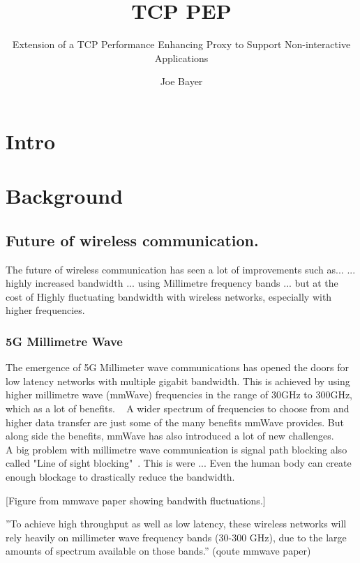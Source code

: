 \documentclass[a4paper,english, 11pt]{report}
\author{Joe Bayer}
\title{TCP PEP}
\subtitle{Extension of a TCP Performance Enhancing Proxy to
Support Non-interactive Applications}
\begin{document}
\uiomasterfp[program={Informatics: Programming and System Architecture}, supervisors={Michael Welzl\and Kristjon Ciko}]

\tableofcontents

\chapter{Intro}

\chapter{Background}

\section{Future of wireless communication.}
The future of wireless communication has seen a lot of improvements such as...
... highly increased bandwidth ... using Millimetre frequency bands ... but at the cost of Highly fluctuating bandwidth with wireless networks, especially with higher frequencies.\\ 

\subsection{5G Millimetre Wave}
The emergence of 5G Millimeter wave communications has opened the doors for low latency networks with multiple gigabit bandwidth. This is achieved by using higher millimetre wave (mmWave) frequencies in the range of 30GHz to 300GHz, which as a lot of benefits. ~\cite{Agrawal_Sharma_2016} A wider spectrum of frequencies to choose from and higher data transfer are just some of the many benefits mmWave provides. But along side the benefits, mmWave has also introduced a lot of new challenges.\\

A big problem with millimetre wave communication is signal path blocking also called "Line of sight blocking"~\cite{mmwave_blocking}. This is were ...
Even the human body can create enough blockage to drastically reduce the bandwidth. 

[Figure from mmwave paper showing bandwith fluctuations.]

''To achieve high throughput as well as low latency, these
wireless networks will rely heavily on millimeter wave frequency bands (30-300 GHz), due to the large amounts of
spectrum available on those bands.'' (qoute mmwave paper)
\end{document}
